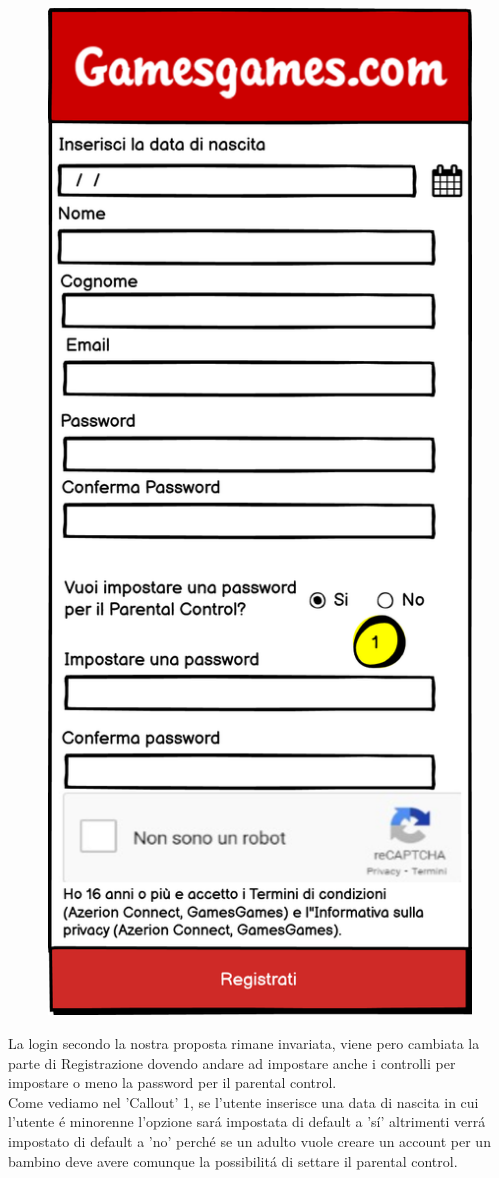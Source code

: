 \documentclass[../Report.tex]{subfiles}
\begin{document}
    \begin{figure}
        \includegraphics[height=.8\textheight]{WRegisterLogin.png}
    \end{figure}
        
    La login secondo la nostra proposta rimane invariata, viene pero cambiata la parte di Registrazione dovendo andare ad impostare anche i controlli per impostare o meno la password per il parental control.\\
    Come vediamo nel 'Callout' 1, se l'utente inserisce una data di nascita in cui l'utente é minorenne l'opzione sará impostata di default a 'sí' altrimenti verrá impostato di default a 'no' perché se un adulto vuole creare un account per un bambino deve avere comunque la possibilitá di settare il parental control.
\end{document}
